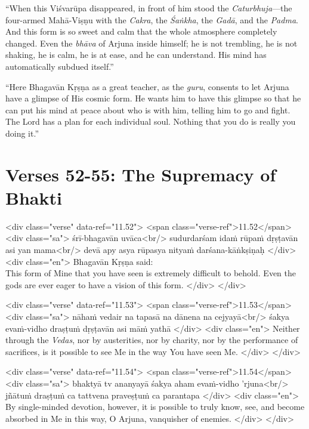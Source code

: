 \enquote{When this Viśvarūpa disappeared, in front of him stood the \textit{Caturbhuja}---the four-armed Mahā-Viṣṇu with the \textit{Cakra}, the \textit{Śaṅkha}, the \textit{Gadā}, and the \textit{Padma}. And this form is so sweet and calm that the whole atmosphere completely changed. Even the \textit{bhāva} of Arjuna inside himself; he is not trembling, he is not shaking, he is calm, he is at ease, and he can understand. His mind has automatically subdued itself.}

\enquote{Here Bhagavān Kṛṣṇa as a great teacher, as the \textit{guru}, consents to let Arjuna have a glimpse of His cosmic form. He wants him to have this glimpse so that he can put his mind at peace about who is with him, telling him to go and fight. The Lord has a plan for each individual soul. Nothing that you do is really you doing it.}


\section{Verses 52-55: The Supremacy of Bhakti}\label{sec-verses-52-55-the-supremacy-of-bhakti}



\begin{html}
<div class="verse" data-ref="11.52">
  <span class="verse-ref">11.52</span>
  <div class="sa">
    śrī-bhagavān uvāca<br/>
    sudurdarśam idaṁ rūpaṁ dṛṣṭavān asi yan mama<br/>
    devā apy asya rūpasya nityaṁ darśana-kāṅkṣiṇaḥ
  </div>
  <div class="en">
    \hspace*{1em}Bhagavān Kṛṣṇa said: \\ This form of Mine that you have seen is extremely difficult to behold. Even the gods are ever eager to have a vision of this form.
  </div>
</div>
\end{html}



\begin{html}
<div class="verse" data-ref="11.53">
  <span class="verse-ref">11.53</span>
  <div class="sa">
    nāhaṁ vedair na tapasā na dānena na cejyayā<br/>
    śakya evaṁ-vidho draṣṭuṁ dṛṣṭavān asi māṁ yathā
  </div>
  <div class="en">
    Neither through the \textit{Vedas}, nor by austerities, nor by charity, nor by the performance of sacrifices, is it possible to see Me in the way You have seen Me.
  </div>
</div>
\end{html}



\begin{html}
<div class="verse" data-ref="11.54">
  <span class="verse-ref">11.54</span>
  <div class="sa">
    bhaktyā tv ananyayā śakya aham evaṁ-vidho ’rjuna<br/>
    jñātuṁ draṣṭuṁ ca tattvena praveṣṭuṁ ca parantapa
  </div>
  <div class="en">
    By single-minded devotion, however, it is possible to truly know, see, and become absorbed in Me in this way, O Arjuna, vanquisher of enemies.
  </div>
</div>
\end{html}



